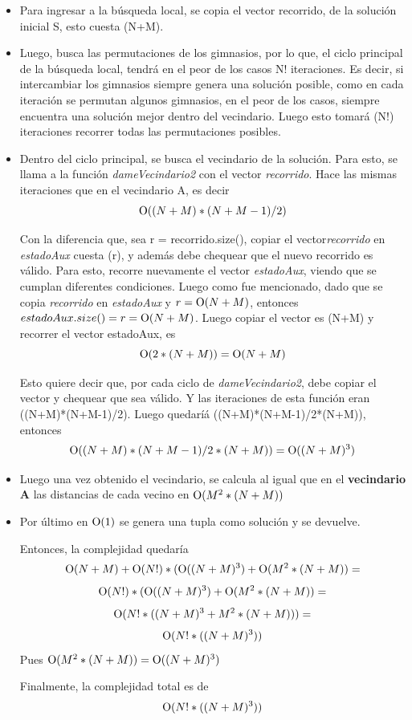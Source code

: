         \begin{itemize}
            \item Para ingresar a la búsqueda local, se copia el vector recorrido, de la solución inicial S, esto cuesta \ord(N+M).
            \item Luego, busca las permutaciones de los gimnasios, por lo que, el ciclo principal de la búsqueda local, tendrá en el peor de los casos N! iteraciones. Es decir, si intercambiar los gimnasios siempre genera una solución posible, como en cada iteración se permutan algunos gimnasios, en el peor de los casos, siempre encuentra una solución mejor dentro del vecindario. Luego esto tomará \ord(N!) iteraciones recorrer todas las permutaciones posibles.
            \item Dentro del ciclo principal, se busca el vecindario de la solución. Para esto, se llama a la función \emph{dameVecindario2} con el vector \emph{recorrido}. Hace las mismas iteraciones que en el vecindario A, es decir 
            \[
                \operatorname{O}((N+M)*(N+M-1)/2)
            \]

            Con la diferencia que, sea r = recorrido.size(), copiar el vector\emph{recorrido} en \emph{estadoAux} cuesta \ord(r), y además debe chequear que el nuevo recorrido es válido. Para esto, recorre nuevamente el vector \emph{estadoAux}, viendo que se cumplan diferentes condiciones. Luego como fue mencionado, dado que se copia \emph{recorrido} en \emph{estadoAux} y $r = \operatorname{O}(N + M)$, entonces $estadoAux.size() = r = \operatorname{O}(N+M)$. Luego copiar el vector es \ord(N+M) y recorrer el vector estadoAux, es 
            \[
                \operatorname{O}(2*(N+M)) = \operatorname{O}(N+M)
            \]

            Esto quiere decir que, por cada ciclo de \emph{dameVecindario2}, debe copiar el vector y chequear que sea válido. Y las iteraciones de esta función eran \ord((N+M)*(N+M-1)/2). Luego quedaríá \ord((N+M)*(N+M-1)/2*(N+M)), entonces
            \[
                \operatorname{O}((N+M)*(N+M-1)/2*(N+M)) = \operatorname{O}((N+M)^3)
            \]

            \item Luego una vez obtenido el vecindario, se calcula al igual que en el \textbf{vecindario A} las distancias de cada vecino en $\operatorname{O}(M^{2} * (N+M))$
            \item Por último en $\operatorname{O}(1)$ se genera una tupla como solución y se devuelve.

            Entonces, la complejidad quedaría
        \[
            \operatorname{O}(N+M) + \operatorname{O}(N!)*(\operatorname{O}((N+M)^{3}) + \operatorname{O}(M^{2}*(N+M)) =
        \]
        \[
            \operatorname{O}(N!)*(\operatorname{O}((N+M)^{3}) + \operatorname{O}(M^{2}*(N+M)) =
        \]
        \[
            \operatorname{O}(N!*((N+M)^{3} + M^{2}*(N+M))) =
        \]
        \[
            \operatorname{O}(N!*((N+M)^{3}))
        \]
        Pues $\operatorname{O}(M^{2}*(N+M)) = \operatorname{O}((N+M)^{3})$

        Finalmente, la complejidad total es de
        \[
            \operatorname{O}(N!*((N+M)^{3}))
        \] 

        \end{itemize}

